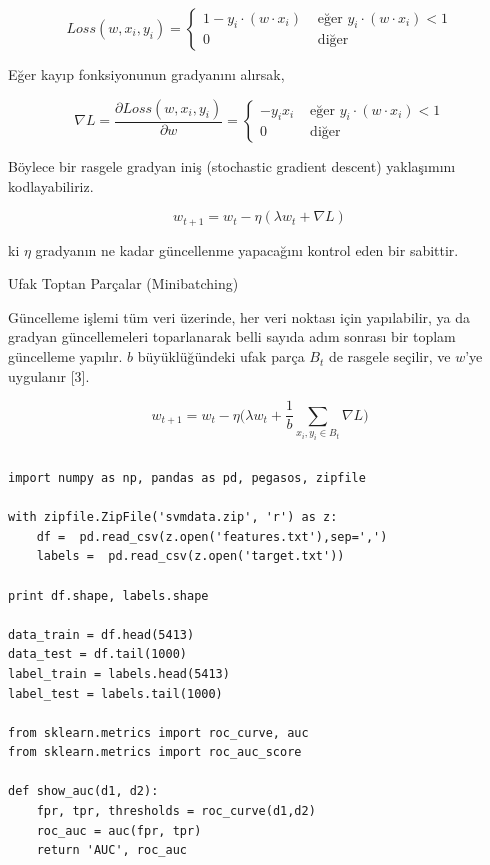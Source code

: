 \documentclass[12pt,fleqn]{article}\usepackage{../../common}
\begin{document}
$$
Loss(w,x_i,y_i) = 
\left\{ \begin{array}{ll}
1-y_i \cdot (w \cdot x_i) & \textrm{ eğer } y_i \cdot (w \cdot x_i) < 1 \\
0 & \textrm { diğer }
\end{array} \right.
$$

Eğer kayıp fonksiyonunun gradyanını alırsak,

$$
\nabla L = \frac{\partial Loss(w,x_i,y_i)}{\partial w} =
\left\{ \begin{array}{ll}
-y_i  x_i & \textrm{ eğer } y_i \cdot (w \cdot x_i) < 1 \\
0 & \textrm { diğer }
\end{array} \right.
$$

Böylece bir rasgele gradyan iniş (stochastic gradient descent) yaklaşımını
kodlayabiliriz. 

$$ w_{t+1} = w_t - \eta (\lambda w_t + \nabla L )$$

ki $\eta$ gradyanın ne kadar güncellenme yapacağını kontrol eden bir sabittir.

Ufak Toptan Parçalar (Minibatching)

Güncelleme işlemi tüm veri üzerinde, her veri noktası için yapılabilir, ya da
gradyan güncellemeleri toparlanarak belli sayıda adım sonrası bir toplam
güncelleme yapılır. $b$ büyüklüğündeki ufak parça $B_t$ de rasgele seçilir, ve
$w$'ye uygulanır [3].

$$
w_{t+1} = w_t - \eta \bigg(
\lambda w_t + \frac{1}{b} \sum _{x_i,y_i \in B_t} \nabla L
\bigg)
$$

\inputminted[fontsize=\footnotesize]{python}{pegasos.py}

\begin{verbatim}
import numpy as np, pandas as pd, pegasos, zipfile

with zipfile.ZipFile('svmdata.zip', 'r') as z:
    df =  pd.read_csv(z.open('features.txt'),sep=',')
    labels =  pd.read_csv(z.open('target.txt'))
    
print df.shape, labels.shape

data_train = df.head(5413)
data_test = df.tail(1000)
label_train = labels.head(5413)
label_test = labels.tail(1000)

from sklearn.metrics import roc_curve, auc
from sklearn.metrics import roc_auc_score

def show_auc(d1, d2):
    fpr, tpr, thresholds = roc_curve(d1,d2)
    roc_auc = auc(fpr, tpr)
    return 'AUC', roc_auc
\end{verbatim}
\end{document}
